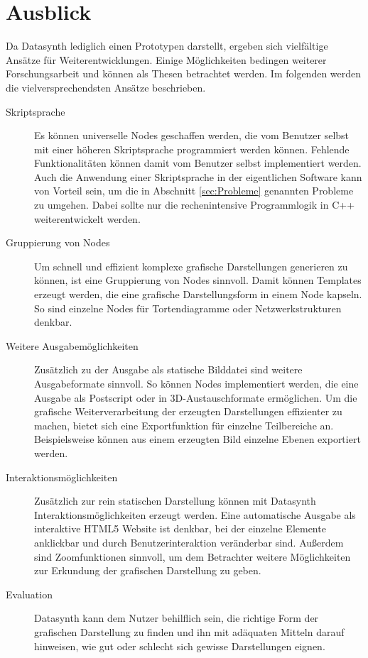\documentclass[a4paper, 
               12pt,
               DIV=calc,
               version=first,
               pdftex,
               headsepline,
               footsepline,
               bibtotocnumbered,
               liststotocnumbered]{scrreprt}
\begin{document}
\section{Ausblick}
\label{sec:Ausblick}
Da Datasynth lediglich einen Prototypen darstellt, ergeben sich vielfältige
Ansätze für Weiterentwicklungen. Einige Möglichkeiten bedingen weiterer 
Forschungsarbeit und können als Thesen betrachtet werden. Im folgenden
werden die vielversprechendsten Ansätze beschrieben.
\begin{description}
\item[Skriptsprache]
Es können universelle Nodes geschaffen werden, die vom Benutzer selbst mit einer höheren
Skriptsprache programmiert werden können. Fehlende Funktionalitäten
können damit vom Benutzer selbst implementiert werden.
Auch die Anwendung einer Skriptsprache in der eigentlichen Software kann von Vorteil sein, um die in
Abschnitt \ref{sec:Probleme} genannten Probleme zu umgehen. Dabei sollte nur
die rechenintensive Programmlogik in C++ weiterentwickelt werden.
\item[Gruppierung von Nodes]
Um schnell und effizient komplexe grafische Darstellungen generieren zu können,
ist eine Gruppierung von Nodes sinnvoll. Damit können Templates erzeugt werden,
die eine grafische Darstellungsform in einem Node kapseln. So sind einzelne Nodes
für Tortendiagramme oder Netzwerkstrukturen denkbar.
\item[Weitere Ausgabemöglichkeiten]
Zusätzlich zu der Ausgabe als statische Bilddatei sind weitere Ausgabeformate sinnvoll.
So können Nodes implementiert werden, die eine Ausgabe als Postscript oder
in 3D-Austauschformate ermöglichen. Um die grafische Weiterverarbeitung der erzeugten
Darstellungen effizienter zu machen, bietet sich eine Exportfunktion für einzelne Teilbereiche
an. Beispielsweise können aus einem erzeugten Bild einzelne Ebenen exportiert werden.
\item[Interaktionsmöglichkeiten]
Zusätzlich zur rein statischen Darstellung können mit Datasynth
Interaktionsmöglichkeiten erzeugt werden. Eine automatische
Ausgabe als interaktive HTML5 Website ist denkbar, bei der einzelne Elemente
anklickbar und durch Benutzerinteraktion veränderbar sind. Außerdem sind 
Zoomfunktionen sinnvoll, um dem Betrachter weitere Möglichkeiten zur
Erkundung der grafischen Darstellung zu geben.
\item[Evaluation]
Datasynth kann dem Nutzer behilflich sein, die richtige Form
der grafischen Darstellung zu finden und ihn mit adäquaten Mitteln darauf
hinweisen, wie gut oder schlecht sich gewisse Darstellungen eignen.
\end{description}
    
\end{document}
